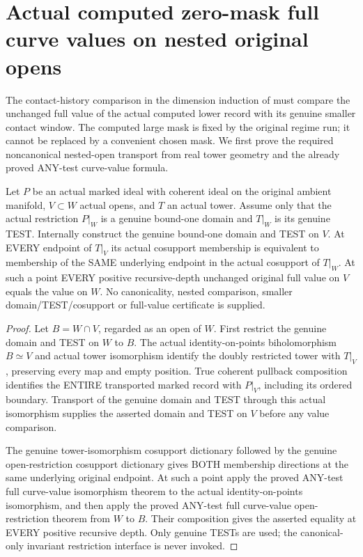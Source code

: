 \section{Actual computed zero-mask full curve values on nested original opens}

The contact-history comparison in the dimension induction of
\cite[Section~5, Step~I.B]{bierstone-milman08-functoriality} must compare
the unchanged full value of the actual computed lower record with its
genuine smaller contact window. The computed large mask is fixed by the
original regime run; it cannot be replaced by a convenient chosen mask.
We first prove the required noncanonical nested-open transport from real
tower geometry and the already proved ANY-test curve-value formula.

\begin{theorem}
\label{hir:original-any-test-curve-full-value-nested-opens}
\leanok
Let $P$ be an actual marked ideal with coherent ideal on the original
ambient manifold, $V\subset W$ actual opens, and $T$ an actual tower.
Assume only that the actual restriction $P|_W$ is a genuine bound-one
domain and $T|_W$ is its genuine TEST. Internally construct the genuine
bound-one domain and TEST on $V$. At EVERY endpoint of $T|_V$ its actual
cosupport membership is equivalent to membership of the SAME underlying
endpoint in the actual cosupport of $T|_W$. At such a point EVERY positive
recursive-depth unchanged original full value on $V$ equals the value on
$W$. No canonicality, nested comparison, smaller domain/TEST/cosupport or
full-value certificate is supplied.
\end{theorem}
\begin{proof}
Let $B=W\cap V$, regarded as an open of $W$. First restrict the genuine
domain and TEST on $W$ to $B$. The actual identity-on-points
biholomorphism $B\simeq V$ and actual tower isomorphism identify the doubly
restricted tower with $T|_V$, preserving every map and empty position.
True coherent pullback composition identifies the ENTIRE transported
marked record with $P|_V$, including its ordered boundary. Transport of
the genuine domain and TEST through this actual isomorphism supplies
the asserted domain and TEST on $V$ before any value comparison.

The genuine tower-isomorphism cosupport dictionary followed by the
genuine open-restriction cosupport dictionary gives BOTH membership
directions at the same underlying original endpoint. At such a point
apply the proved ANY-test full curve-value isomorphism theorem to the
actual identity-on-points isomorphism, and then apply the proved ANY-test
full curve-value open-restriction theorem from $W$ to $B$. Their
composition gives the asserted equality at EVERY positive recursive
depth. Only genuine TESTs are used; the canonical-only invariant
restriction interface is never invoked.
\end{proof}

